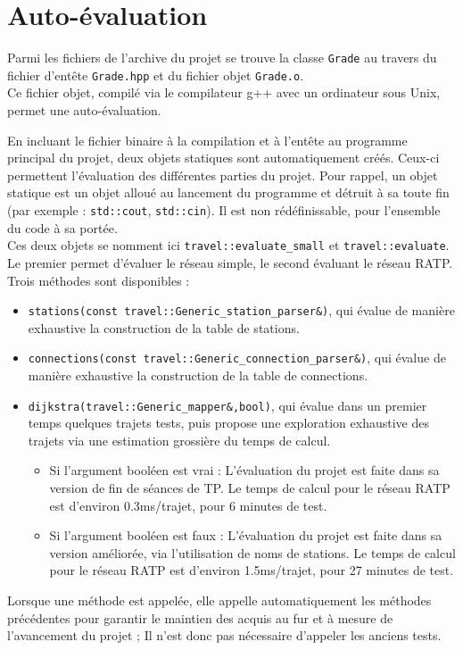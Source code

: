 \documentclass[9pts]{article}
\begin{document}
\section{Auto-évaluation}
\label{sec::autoeval}
Parmi les fichiers de l'archive du projet se trouve la classe \texttt{Grade} au travers du fichier d'entête \texttt{Grade.hpp} et du fichier objet \texttt{Grade.o}.\\

Ce fichier objet, compilé via le compilateur g++ avec un ordinateur sous Unix, permet une auto-évaluation.

En incluant le fichier binaire à la compilation et à l'entête au programme principal du projet, deux objets statiques sont automatiquement créés. Ceux-ci permettent l'évaluation des différentes parties du projet.
Pour rappel, un objet statique est un objet alloué au lancement du programme et détruit à sa toute fin (par exemple : \texttt{std::cout}, \texttt{std::cin}). Il est non rédéfinissable, pour l'ensemble du code à sa portée.\\

Ces deux objets se nomment ici \texttt{travel::evaluate\_small} et \texttt{travel::evaluate}. Le premier permet d'évaluer le réseau simple, le second évaluant le réseau RATP.\\

Trois méthodes sont disponibles :
\begin{itemize}
  \item \texttt{stations(const travel::Generic\_station\_parser\&)}, qui évalue de manière exhaustive la construction de la table de stations.
  \item \texttt{connections(const travel::Generic\_connection\_parser\&)}, qui évalue de manière exhaustive la construction de la table de connections.
  \item \texttt{dijkstra(travel::Generic\_mapper\&,bool)}, qui évalue dans un premier temps quelques trajets tests, puis propose une exploration exhaustive des trajets via une estimation grossière du temps de calcul.
    \begin{itemize}
      \item Si l'argument booléen est vrai : L'évaluation du projet est faite dans sa version de fin de séances de TP. Le temps de calcul pour le réseau RATP est d'environ 0.3ms/trajet, pour 6 minutes de test.
      \item Si l'argument booléen est faux : L'évaluation du projet est faite dans sa version améliorée, via l'utilisation de noms de stations. Le temps de calcul pour le réseau RATP est d'environ 1.5ms/trajet, pour 27 minutes de test.
    \end{itemize}
\end{itemize}
Lorsque une méthode est appelée, elle appelle automatiquement les méthodes précédentes pour garantir le maintien des acquis au fur et à mesure de l'avancement du projet ; Il n'est donc pas nécessaire d'appeler les anciens tests.\\
\end{document}
